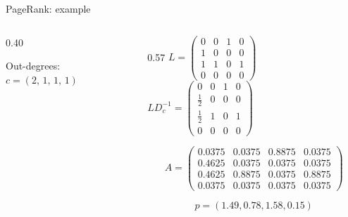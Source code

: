\documentclass[aspectratio=169,t]{beamer}
\begin{document}
\begin{frame}{PageRank: example}
\begin{columns}[T]
  \begin{column}{0.40\textwidth}
    \vspace{0.3cm}
    \begin{center}
    \end{center}
    \vspace{0.1cm}
    Out-degrees: $c = (2,\,1,\,1,\,1)$\\[0.1cm]
  \end{column}
  \begin{column}{0.57\textwidth}
    \vspace{0.1cm}
    {\small
    $L = \begin{pmatrix}0&0&1&0\\1&0&0&0\\1&1&0&1\\0&0&0&0\end{pmatrix}$\quad
    $LD_c^{-1} = \begin{pmatrix}0&0&1&0\\[2pt]\tfrac{1}{2}&0&0&0\\[2pt]\tfrac{1}{2}&1&0&1\\0&0&0&0\end{pmatrix}$
    }
    \vspace{0.15cm}

    $$A = \begin{pmatrix}
        0.0375&0.0375&0.8875&0.0375\\
        0.4625&0.0375&0.0375&0.0375\\
        0.4625&0.8875&0.0375&0.8875\\
        0.0375&0.0375&0.0375&0.0375
    \end{pmatrix}$$

    $$p = (1.49, 0.78, 1.58, 0.15)$$

  \end{column}
\end{columns}
\end{frame}
\end{document}

